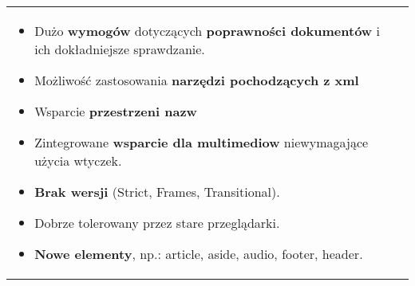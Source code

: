 \documentclass[../main.tex]{subfiles}
\begin{document}
    \begin{table}[H]
        \begin{center}
            \begin{tabular}{p{8cm} p{8cm}}
                \begin{itemize}
                    \item Dużo \textbf{wymogów} dotyczących \textbf{poprawności dokumentów} i ich dokładniejsze sprawdzanie.
                    \item Możliwość zastosowania \textbf{narzędzi pochodzących z xml}
                    \item Wsparcie \textbf{przestrzeni nazw}
                    \item Zintegrowane \textbf{wsparcie dla multimediow} niewymagające użycia wtyczek.
                    \item \textbf{Brak wersji} (Strict, Frames, Transitional).
                    \item Dobrze tolerowany przez stare przeglądarki.
                    \item \textbf{Nowe elementy}, np.: article, aside, audio, footer, header.


\end{itemize}
\end{tabular}
\end{center}
\end{table}
\end{document}
